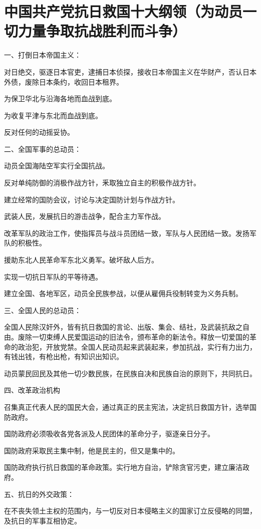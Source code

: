 \section[中国共产党抗日救国十大纲领（为动员一切力量争取抗战胜利而斗争）]{中国共产党抗日救国十大纲领（为动员一切力量争取抗战胜利而斗争）}


一、打倒日本帝国主义：

对日绝交，驱逐日本官吏，逮捕日本侦探，接收日本帝国主义在华财产，否认日本外债，废除日本条约，收回日本租界。

为保卫华北与沿海各地而血战到底。

为收复平津与东北而血战到底。

反对任何的动摇妥协。

二、全国军事的总动员：

动员全国海陆空军实行全国抗战。

反对单纯防御的消极作战方针，釆取独立自主的积极作战方针。

建立经常的国防会议，讨论与决定国防计划与作战方针。

武装人民，发展抗日的游击战争，配合主力军作战。

改革军队的政治工作，使指挥员与战斗员团结一致，军队与人民团结一致。发扬军队的积极性。

援助东北人民革命军东北义勇军。破坏敌人后方。

实现一切抗日军队的平等待遇。

建立全国、各地军区，动员全民族参战，以便从雇佣兵役制转变为义务兵制。

三、全国人民的总动员：

全国人民除汉奸外，皆有抗日救国的言论、出版、集会、结社，及武装抗敌之自由。废除一切束缚人民爱国运动的旧法令，颁布革命的新法令。释放一切爱国的革命的政治犯，开放党禁。全国人民动员起来武装起来，参加抗战，实行有力出力，有钱出钱，有枪出枪，有知识出知识。

动员蒙民回民及其他一切少数民族，在民族自决和民族自治的原则下，共同抗日。

四、改革政治机构

召集真正代表人民的国民大会，通过真正的民主宪法，决定抗日救国方针，选举国防政府。

国防政府必须吸收各党各派及人民团体的革命分子，驱逐亲日分子。

国防政府采取民主集中制，他是民主的，但又是集中的。

国防政府执行抗日救国的革命政策。实行地方自治，铲除贪官污吏，建立廉洁政府。

五、抗日的外交政策：

在不丧失领土主权的范围内，与一切反对日本侵略主义的国家订立反侵略的同盟，及抗日的军事互相协定。


